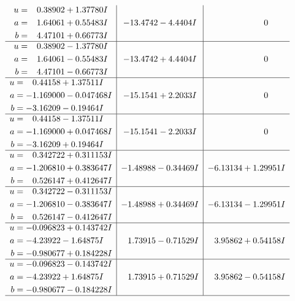 \documentclass[1p]{elsarticle_modified}
\theoremstyle{definition}
\begin{document}
$$\begin{array}{c|c|c}
\begin{aligned}
u &= \phantom{-}0.38902 + 1.37780 I \\
a &= \phantom{-}1.64061 + 0.55483 I \\
b &= \phantom{-}4.47101 + 0.66773 I\end{aligned}
 & -13.4742 - 4.4404 I & \phantom{-0.000000 } 0 \\ \hline\begin{aligned}
u &= \phantom{-}0.38902 - 1.37780 I \\
a &= \phantom{-}1.64061 - 0.55483 I \\
b &= \phantom{-}4.47101 - 0.66773 I\end{aligned}
 & -13.4742 + 4.4404 I & \phantom{-0.000000 } 0 \\ \hline\begin{aligned}
u &= \phantom{-}0.44158 + 1.37511 I \\
a &= -1.169000 - 0.047468 I \\
b &= -3.16209 - 0.19464 I\end{aligned}
 & -15.1541 + 2.2033 I & \phantom{-0.000000 } 0 \\ \hline\begin{aligned}
u &= \phantom{-}0.44158 - 1.37511 I \\
a &= -1.169000 + 0.047468 I \\
b &= -3.16209 + 0.19464 I\end{aligned}
 & -15.1541 - 2.2033 I & \phantom{-0.000000 } 0 \\ \hline\begin{aligned}
u &= \phantom{-}0.342722 + 0.311153 I \\
a &= -1.206810 + 0.383647 I \\
b &= \phantom{-}0.526147 + 0.412647 I\end{aligned}
 & -1.48988 - 0.34469 I & -6.13134 + 1.29951 I \\ \hline\begin{aligned}
u &= \phantom{-}0.342722 - 0.311153 I \\
a &= -1.206810 - 0.383647 I \\
b &= \phantom{-}0.526147 - 0.412647 I\end{aligned}
 & -1.48988 + 0.34469 I & -6.13134 - 1.29951 I \\ \hline\begin{aligned}
u &= -0.096823 + 0.143742 I \\
a &= -4.23922 - 1.64875 I \\
b &= -0.980677 + 0.184228 I\end{aligned}
 & \phantom{-}1.73915 - 0.71529 I & \phantom{-}3.95862 + 0.54158 I \\ \hline\begin{aligned}
u &= -0.096823 - 0.143742 I \\
a &= -4.23922 + 1.64875 I \\
b &= -0.980677 - 0.184228 I\end{aligned}
 & \phantom{-}1.73915 + 0.71529 I & \phantom{-}3.95862 - 0.54158 I\\
 \hline 
 \end{array}$$\newpage\newpage\renewcommand{\arraystretch}{1}
\end{document}
